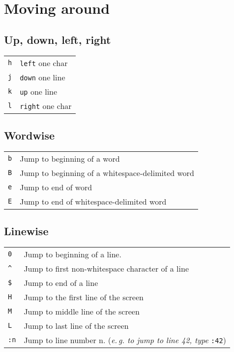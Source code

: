 \section{Moving around}
\subsection{Up, down, left, right}
\begin{tabular}{@{}p{\the\MyLen}%
		  @{}p{\linewidth-\the\MyLen}}
\verb!h!	& \texttt{left} one char\\
\verb!j!	& \texttt{down} one line\\
\verb!k!	& \texttt{up} one line\\
\verb!l!	& \texttt{right} one char\\
\end{tabular}
\subsection{Wordwise}
\begin{tabular}{@{}p{\the\MyLen}%
		  @{}p{\linewidth-\the\MyLen}}
\verb!b!	& Jump to beginning of a word\\
\verb!B!	& Jump to beginning of a whitespace-delimited word\\
\verb!e!	& Jump to end of word\\
\verb!E!	& Jump to end of whitespace-delimited word\\
\end{tabular}
\subsection{Linewise}
\begin{tabular}{@{}p{\the\MyLen}%
		  @{}p{\linewidth-\the\MyLen}}
\verb!0!	& Jump to beginning of a line.\\
\verb!^!	& Jump to first non-whitespace character of a line\\
\verb!$!	& Jump to end of a line\\
\verb!H!	& Jump to the first line of the screen\\
\verb!M!	& Jump to middle line of the screen\\
\verb!L!	& Jump to last line of the screen\\
\verb!:n!	& Jump to line number n. (\textit{e.\,g. to jump to line 42, type} \verb!:42!)
\end{tabular}

